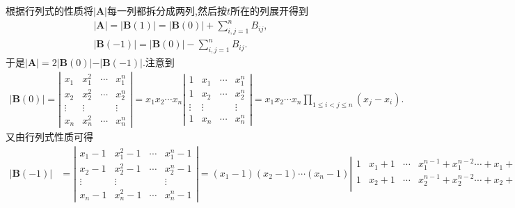 \documentclass[lang=cn,newtx,10pt,scheme=chinese]{elegantbook}
\begin{document}
\begin{solution}
        根据行列式的性质将\(\vert\boldsymbol{A}\vert\)每一列都拆分成两列,然后按\(t\)所在的列展开得到
        \begin{gather*}
            \vert\boldsymbol{A}\vert=\vert\boldsymbol{B}(1)\vert=\vert\boldsymbol{B}(0)\vert+\sum_{i,j = 1}^{n}B_{ij},
            \\
            \vert\boldsymbol{B}(-1)\vert=\vert\boldsymbol{B}(0)\vert-\sum_{i,j = 1}^{n}B_{ij}.
        \end{gather*}
        于是\(\vert\boldsymbol{A}\vert = 2\vert\boldsymbol{B}(0)\vert - \vert\boldsymbol{B}(-1)\vert\).注意到
        \begin{align*}
           \vert\boldsymbol{B}(0)\vert=\left|\begin{matrix}
        x_1 & x_{1}^{2} & \cdots & x_{1}^{n}\\
        x_2 & x_{2}^{2} & \cdots & x_{2}^{n}\\
        \vdots & \vdots &  & \vdots\\
        x_n & x_{n}^{2} & \cdots & x_{n}^{n}
        \end{matrix}\right|=x_1x_2\cdots x_n\left|\begin{matrix}
        1 & x_1 & \cdots & x_{1}^{n}\\
        1 & x_2 & \cdots & x_{2}^{n}\\
        \vdots & \vdots &  & \vdots\\
        1 & x_n & \cdots & x_{n}^{n}
        \end{matrix}\right|=x_1x_2\cdots x_n\prod_{1\leqslant i < j\leqslant n}(x_j - x_i). 
        \end{align*}
        又由行列式性质可得
        \begin{align*}
            \vert\boldsymbol{B}(-1)\vert&=\left|\begin{matrix}
        x_1 - 1 & x_{1}^{2} - 1 & \cdots & x_{1}^{n} - 1\\
        x_2 - 1 & x_{2}^{2} - 1 & \cdots & x_{2}^{n} - 1\\
        \vdots & \vdots &  & \vdots\\
        x_n - 1 & x_{n}^{2} - 1 & \cdots & x_{n}^{n} - 1
        \end{matrix}\right|
        =(x_1 - 1)(x_2 - 1)\cdots (x_n - 1)\left|\begin{matrix}
        1 & x_1 + 1 & \cdots & x_{1}^{n - 1} + x_{1}^{n - 2}\cdots + x_1 + 1\\
        1 & x_2 + 1 & \cdots & x_{2}^{n - 1} + x_{2}^{n - 2}\cdots + x_2 + 1\\

\end{matrix}
\end{align*}
\end{solution}
\end{document}
